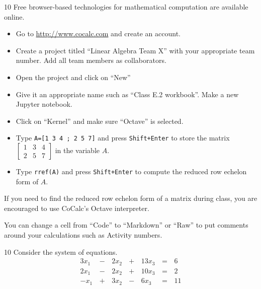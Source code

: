 
\begin{applicationActivities}


\begin{activity}{10}
Free browser-based technologies for mathematical computation
are available online.
\begin{itemize}
\item Go to \url{http://www.cocalc.com} and create an account.
\item Create a project titled ``Linear Algebra Team X'' with your appropriate
      team number.  Add all team members as collaborators.
\item Open the project and click on ``New''
\item Give it an appropriate name such as ``Class E.2 workbook''.  Make a new
      Jupyter notebook.
\item Click on ``Kernel'' and make sure ``Octave'' is selected.
\item Type \texttt{A=[1 3 4 ; 2 5 7]} and press \texttt{Shift+Enter}
      to store the matrix
      \(\begin{bmatrix} 1 & 3 & 4 \\ 2 & 5 & 7\end{bmatrix}\)
      in the variable $A$.
\item Type \texttt{rref(A)} and press \texttt{Shift+Enter}
      to compute the reduced row echelon form of $A$.
\end{itemize}
\end{activity}

\begin{remark}
If you need to find the reduced row echelon form of a matrix during class, you
are encouraged to use CoCalc's Octave interpreter.

You can change a cell from ``Code'' to ``Markdown'' or ``Raw'' to put comments
around your calculations such as Activity numbers.
\end{remark}

\begin{activity}{10}
Consider the system of equations.
 \[
		\begin{alignedat}{4}
   		  3x_1 &\,-\,& 2x_2 &\,+\,& 13x_3 &\,=\,& 6 \\
   		  2x_1 &\,-\,& 2x_2 &\,+\,& 10x_3 &\,=\,& 2 \\
   		  -x_1 &\,+\,& 3x_2 &\,-\,&  6x_3 &\,=\,& 11
   		\end{alignedat}
\]


\end{activity}
\end{applicationActivities}
